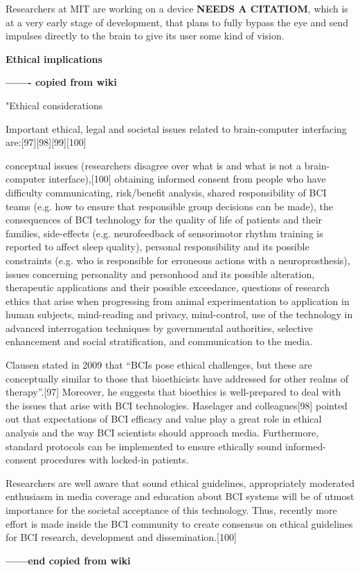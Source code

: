 Researchers at MIT are working on a device {\bf NEEDS A CITATIOM}, which is at a very early stage of development, that plans to fully bypass the eye and send impulses directly to the brain to give its user some kind of vision.

{\bf Ethical implications}


{\bf ------- copied from wiki} 

"Ethical considerations

Important ethical, legal and societal issues related to brain-computer interfacing are:[97][98][99][100]

    conceptual issues (researchers disagree over what is and what is not a brain-computer interface),[100]
    obtaining informed consent from people who have difficulty communicating,
    risk/benefit analysis,
    shared responsibility of BCI teams (e.g. how to ensure that responsible group decisions can be made),
    the consequences of BCI technology for the quality of life of patients and their families,
    side-effects (e.g. neurofeedback of sensorimotor rhythm training is reported to affect sleep quality),
    personal responsibility and its possible constraints (e.g. who is responsible for erroneous actions with a neuroprosthesis),
    issues concerning personality and personhood and its possible alteration,
    therapeutic applications and their possible exceedance,
    questions of research ethics that arise when progressing from animal experimentation to application in human subjects,
    mind-reading and privacy,
    mind-control,
    use of the technology in advanced interrogation techniques by governmental authorities,
    selective enhancement and social stratification, and
    communication to the media.

Clausen stated in 2009 that “BCIs pose ethical challenges, but these are conceptually similar to those that bioethicists have addressed for other realms of therapy”.[97] Moreover, he suggests that bioethics is well-prepared to deal with the issues that arise with BCI technologies. Haselager and colleagues[98] pointed out that expectations of BCI efficacy and value play a great role in ethical analysis and the way BCI scientists should approach media. Furthermore, standard protocols can be implemented to ensure ethically sound informed-consent procedures with locked-in patients.

Researchers are well aware that sound ethical guidelines, appropriately moderated enthusiasm in media coverage and education about BCI systems will be of utmost importance for the societal acceptance of this technology. Thus, recently more effort is made inside the BCI community to create consensus on ethical guidelines for BCI research, development and dissemination.[100]


{\bf ------end copied from wiki} 
